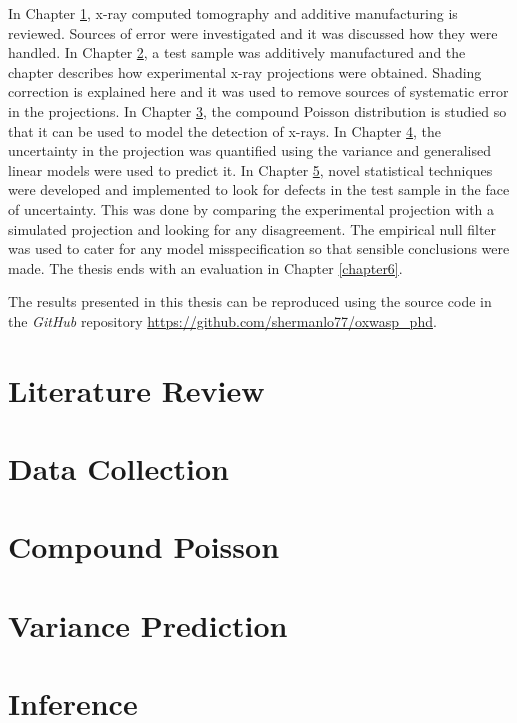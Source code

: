 \documentclass[12pt, a4paper, twoside]{memoir}
\begin{document}
In Chapter \ref{chapter1}, x-ray computed tomography and additive manufacturing is reviewed. Sources of error were investigated and it was discussed how they were handled. In Chapter \ref{chapter2}, a test sample was additively manufactured and the chapter describes how experimental x-ray projections were obtained. Shading correction is explained here and it was used to remove sources of systematic error in the projections. In Chapter \ref{chapter3}, the compound Poisson distribution is studied so that it can be used to model the detection of x-rays. In Chapter \ref{chapter4}, the uncertainty in the projection was quantified using the variance and generalised linear models were used to predict it. In Chapter \ref{chapter5}, novel statistical techniques were developed and implemented to look for defects in the test sample in the face of uncertainty. This was done by comparing the experimental projection with a simulated projection and looking for any disagreement. The empirical null filter was used to cater for any model misspecification so that sensible conclusions were made. The thesis ends with an evaluation in Chapter \ref{chapter6}.

The results presented in this thesis can be reproduced using the source code in the \emph{GitHub} repository \url{https://github.com/shermanlo77/oxwasp_phd}.

\chapter{Literature Review}
\label{chapter1}


\chapter{Data Collection}
\label{chapter2}


\chapter{Compound Poisson}
\label{chapter3}


\chapter{Variance Prediction}
\label{chapter4}


\chapter{Inference}
\label{chapter5}

\end{document}
